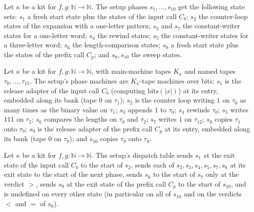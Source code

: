 \begin{definition}
\label{Turing.NTimeDiag.QySPh}
\leanok
{}
Let $\kappa$ be a kit for $f, g : \mathbb{N} \to \mathbb{N}$. The setup phases $s_1, \dots, s_{10}$
get the following state sets: $s_1$ a fresh start state plus the states of the input call $C_b$;
$s_2$ the counter-loop states of the expansion with a one-letter pattern; $s_3$ and $s_7$ the
constant-writer states for a one-letter word; $s_4$ the rewind states; $s_5$ the constant-writer
states for a three-letter word; $s_6$ the length-comparison states; $s_9$ a fresh start state plus
the states of the prefix call $C_p$; and $s_8, s_{10}$ the sweep states.
\end{definition}

\begin{definition}
\label{Turing.NTimeDiag.qySetM}
\leanok
{}
Let $\kappa$ be a kit for $f, g : \mathbb{N} \to \mathbb{N}$, with main-machine tapes $K_\kappa$
and named tapes $\tau_0, \dots, \tau_{15}$. The setup's phase machines are $K_\kappa$-tape machines
over bits: $s_1$ is the release adapter of the input call $C_b$ (computing $\mathrm{bits}(|x|)$)
at its entry, embedded along its bank (tape $0$ on $\tau_1$); $s_2$ is the counter loop writing $1$
on $\tau_0$ as many times as the binary value on $\tau_1$; $s_3$ appends $1$ to $\tau_0$; $s_4$
rewinds $\tau_0$; $s_5$ writes $111$ on $\tau_2$; $s_6$ compares the lengths on $\tau_0$ and
$\tau_2$; $s_7$ writes $1$ on $\tau_{12}$; $s_8$ copies $\tau_1$ onto $\tau_9$; $s_9$ is the
release adapter of the prefix call $C_p$ at its entry, embedded along its bank (tape $0$ on
$\tau_9$); and $s_{10}$ copies $\tau_9$ onto $\tau_8$.
\end{definition}

\begin{definition}
\label{Turing.NTimeDiag.qySetRed}
\leanok
{}
Let $\kappa$ be a kit for $f, g : \mathbb{N} \to \mathbb{N}$. The setup's dispatch table sends
$s_1$ at the exit state of the input call $C_b$ to the start of $s_2$, sends each of
$s_2, s_3, s_4, s_5, s_7, s_8$ at its exit state to the start of the next phase, sends $s_6$ to the
start of $s_7$ only at the verdict $>$, sends $s_9$ at the exit state of the prefix call $C_p$ to
the start of $s_{10}$, and is undefined on every other state (in particular on all of $s_{10}$
and on the verdicts $<$ and $=$ of $s_6$).
\end{definition}

